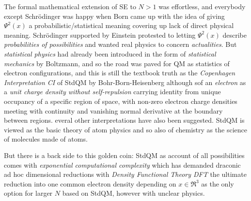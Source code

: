 \documentclass[11pt]{article} %
\begin{document}
The formal mathematical extension of SE to $N>1$ was effortless,  and everybody except Schr\"odinger was happy when Born came up with the idea of giving $\Psi^2(x)$ a probabilistic/statistical meaning covering up lack of direct physical meaning.
Schr\"odinger supported by Einstein protested to letting $\Psi^2 (x)$ describe \emph{probabilities of possibilities} and wanted real physics to concern \emph{actualities}.  But \emph{statistical physics} had already been introduced in the form of \emph{statistical mechanics} by Boltzmann,  and so the road was paved for QM as statistics of electron configurations,  and this is still the textbook truth as the \emph{Copenhagen Interpretation CI} of StdQM by Bohr-Born-Heisenberg although sof an \emph{electron} as a \emph{unit charge density without self-repulsion} carrying identity from unique occupancy of a specific region of space,  with non-zero electron charge densities meeting with continuity and vanishing normal derivative at the boundary between regions.  everal other interpretations have also been suggested.   
StdQM is viewed as the basic theory of atom physics and so also of chemistry as the science of molecules made of atoms.

But there is a back side to this golden coin: StdQM as account of all possibilities comes with \emph{exponential computational complexity} 
which has demanded draconic ad hoc dimensional reductions with \emph{Density Functional Theory DFT} the ultimate reduction into one common electron density depending on $x\in\Re^3$ as the only option for larger $N$ based on StdQM,  however with unclear physics.
\end{document}
